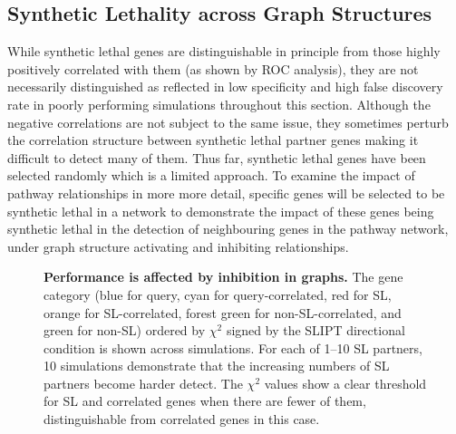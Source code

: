 \FloatBarrier

\subsection{Synthetic Lethality across Graph Structures}
\label{chap5:graphsim_str}

\FloatBarrier

While synthetic lethal genes are distinguishable in principle from those highly positively correlated with them (as shown by \gls{ROC} analysis), they are not necessarily distinguished as reflected in low specificity and high false discovery rate in poorly performing simulations throughout this section. Although the negative correlations are not subject to the same issue, they sometimes perturb the correlation structure between synthetic lethal partner genes making it difficult to detect many of them. Thus far, synthetic lethal genes have been selected randomly which is a limited approach. To examine the impact of pathway relationships in more more detail, specific genes will be selected to be synthetic lethal in a network to demonstrate the impact of these genes being synthetic lethal in the detection of neighbouring genes in the pathway network, under graph structure activating and inhibiting relationships.


\begin{figure*}[!ht]
\begin{mdframed}
     \begin{center}
      \end{center}
      \caption[Performance is affected by inhibition in graphs]{\small \textbf{Performance is affected by inhibition in graphs.} The gene category (blue for query, cyan for query-correlated, red for SL, orange for SL-correlated, forest green for non-SL-correlated, and green for non-SL) ordered by $\chi^2$ signed by the \gls{SLIPT} directional condition is shown across simulations. For each of 1--10 SL partners, 10 simulations demonstrate that the increasing numbers of SL partners become harder detect. The $\chi^2$ values show a clear threshold for SL and correlated genes when there are fewer of them, distinguishable from correlated genes in this case.}
\end{mdframed}
\label{fig:simulation1206_Str_randx_Graph4D}
\end{figure*}

